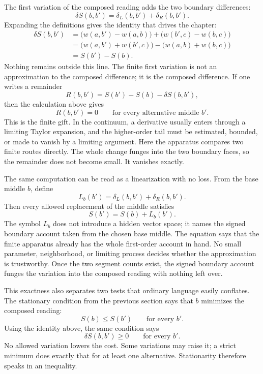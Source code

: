 The first variation of the composed reading adds the two boundary differences:
\[
  \delta S(b,b') = \delta_L(b,b') + \delta_R(b,b').
\]
Expanding the definitions gives the identity that drives the chapter:
\[
\begin{aligned}
  \delta S(b,b')
    &= \bigl(w(a,b') - w(a,b)\bigr)
       + \bigl(w(b',c) - w(b,c)\bigr) \\
    &= \bigl(w(a,b') + w(b',c)\bigr)
       - \bigl(w(a,b) + w(b,c)\bigr) \\
    &= S(b') - S(b).
\end{aligned}
\]
Nothing remains outside this line. The finite first variation is not an approximation to the composed difference; it is the composed difference. If one writes a remainder
\[
  R(b,b') = S(b') - S(b) - \delta S(b,b'),
\]
then the calculation above gives
\[
  R(b,b') = 0
  \qquad \text{for every alternative middle } b'.
\]
This is the finite gift. In the continuum, a derivative usually enters through a limiting Taylor expansion, and the higher-order tail must be estimated, bounded, or made to vanish by a limiting argument. Here the apparatus compares two finite routes directly. The whole change funges into the two boundary faces, so the remainder does not become small. It vanishes exactly.

The same computation can be read as a linearization with no loss. From the base middle $b$, define
\[
  L_b(b') = \delta_L(b,b') + \delta_R(b,b').
\]
Then every allowed replacement of the middle satisfies
\[
  S(b') = S(b) + L_b(b').
\]
The symbol $L_b$ does not introduce a hidden vector space; it names the signed boundary account taken from the chosen base middle. The equation says that the finite apparatus already has the whole first-order account in hand. No small parameter, neighborhood, or limiting process decides whether the approximation is trustworthy. Once the two segment counts exist, the signed boundary account funges the variation into the composed reading with nothing left over.

This exactness also separates two tests that ordinary language easily conflates. The stationary condition from the previous section says that $b$ minimizes the composed reading:
\[
  S(b) \le S(b') \qquad \text{for every } b'.
\]
Using the identity above, the same condition says
\[
  \delta S(b,b') \ge 0 \qquad \text{for every } b'.
\]
No allowed variation lowers the cost. Some variations may raise it; a strict minimum does exactly that for at least one alternative. Stationarity therefore speaks in an inequality.

